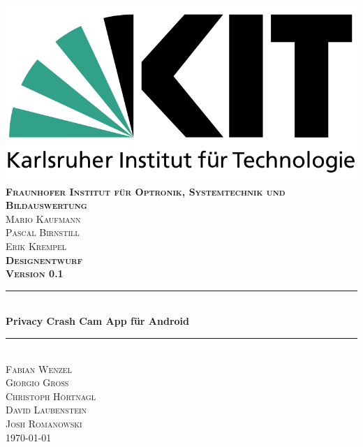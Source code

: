 \begin{titlepage}

\begin{center}

\includegraphics[width=0.5\linewidth]{data/KITLogo.png}\\[0.5cm]
  

\textsc{\bfseries Fraunhofer Institut für Optronik, Systemtechnik und Bildauswertung}\\[0.5cm]
\textsc{Mario Kaufmann\\Pascal Birnstill\\Erik Krempel}\\[2cm]

\textsc{\LARGE \bfseries Designentwurf}\\[0.5cm]
\textsc{\bfseries Version 0.1}\\[0.2cm]


\newcommand{\HRule}{\rule{\linewidth}{0.5mm}} 
{\color{mintgreen}\HRule} \\[0.4cm]
{\huge \bfseries Privacy Crash Cam App für Android}\\[0.4cm]
{\color{mintgreen}\HRule} \\[1cm]

\textsc{\Large Fabian Wenzel\\ Giorgio Groß\\ Christoph Hörtnagl\\ David Laubenstein\\[0.15cm]Josh Romanowski} \\[2cm]

{\large \today}

\end{center}

\end{titlepage}